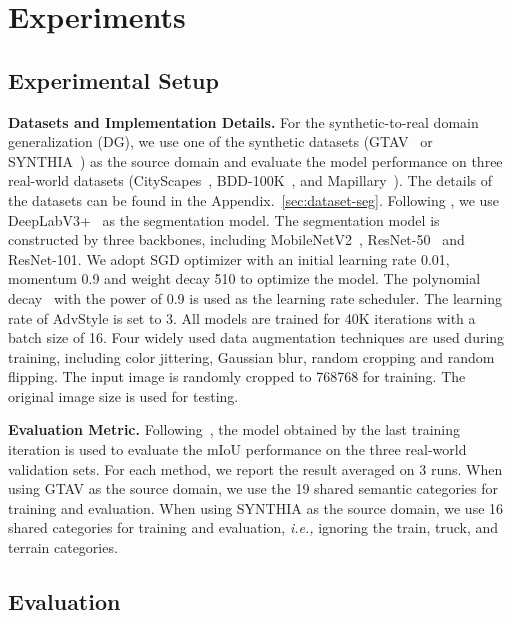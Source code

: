 \documentclass{article}
\newcommand{\ours}{AdvStyle\xspace}
\begin{document}
\section{Experiments}
\label{sec:exp}

\subsection{Experimental Setup}
\label{sec:seg_imple_details}


\textbf{Datasets and Implementation Details.}
For the synthetic-to-real domain generalization (DG), we use one of the synthetic datasets (GTAV~\cite{gtav} or SYNTHIA~\cite{synthia}) as the source domain and evaluate the model performance on three real-world datasets (CityScapes~\cite{CityScapes}, BDD-100K~\cite{bdd}, and Mapillary~\cite{mapillary}).
The details of the datasets can be found in the Appendix.~\ref{sec:dataset-seg}.
Following \cite{robustnet}, we use DeepLabV3+~\cite{deeplab} as the segmentation model. The segmentation model is constructed by three backbones, including MobileNetV2~\cite{sandler2018mobilenetv2}, ResNet-50~\cite{he2016deep} and ResNet-101. We adopt SGD optimizer with an initial learning rate 0.01, momentum 0.9 and weight decay 510 to optimize the model. The polynomial decay~\cite{liu2015parsenet} with the power of 0.9 is used as the learning rate scheduler. The learning rate of \ours  is set to 3. All models are trained for 40K iterations with a batch size of 16. Four widely used data augmentation techniques are used during training, including color jittering, Gaussian blur, random cropping and random flipping. The input image is randomly cropped to 768768 for training. The original image size is used for testing.

\textbf{Evaluation Metric.} 
Following~\cite{robustnet}, the model obtained by the last training iteration is used to evaluate the mIoU performance on the three real-world validation sets. For each method, we report the result averaged on 3 runs. When using GTAV as the source domain, we use the 19 shared semantic categories for training and evaluation. When using SYNTHIA as the source domain, we use 16 shared categories for training and evaluation, \textit{i.e.,} ignoring the train, truck, and terrain categories.



\subsection{Evaluation}
\end{document}
